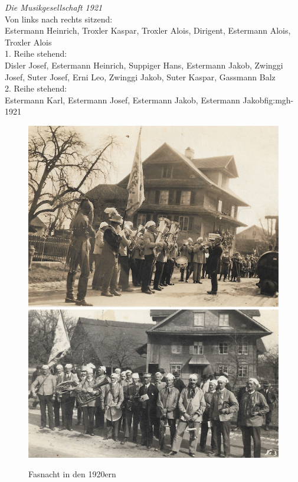 \documentclass[]{book}
\begin{document}

\clearpage

{ \emph{Die Musikgesellschaft 1921}\\
    Von links nach rechts sitzend:\\
    Estermann Heinrich, Troxler Kaspar, Troxler Alois, Dirigent, Estermann Alois,
    Troxler Alois\\
    1. Reihe stehend:\\
    Disler Josef, Estermann Heinrich, Suppiger Hans, Estermann Jakob, Zwinggi
    Josef, Suter Josef, Erni Leo, Zwinggi Jakob, Suter Kaspar, Gassmann Balz\\
    2. Reihe stehend:\\
    Estermann Karl, Estermann Josef, Estermann Jakob, Estermann
    Jakob}{fig:mgh-1921}

\begin{figure}[!ht]
    \centerline{
        \includegraphics{./chap/1900-1925/Fasnacht-1920er-1.jpg}
        \includegraphics{./chap/1900-1925/Fasnacht-1920er-2.jpg}}
    \label{fig:mgh-fasnacht-1920}
    \caption{Fasnacht in den 1920ern}
\end{figure}
\clearpage
\end{document}
